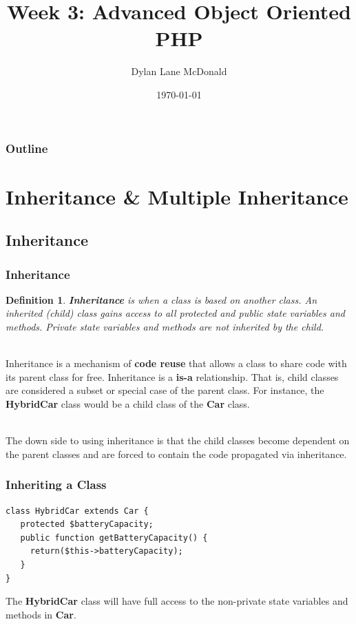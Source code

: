 \documentclass[aspectratio=169]{beamer}
\title{Week 3: Advanced Object Oriented PHP}
\author{Dylan Lane McDonald}
\institute{CNM STEMulus Center\\Web Development with PHP}
\date{\today}
\newtheorem{defn}{Definition}
\begin{document}
\lstset{language=Java}
\begin{frame}
\titlepage
\end{frame}

\begin{frame}
\frametitle{Outline}
\tableofcontents
\end{frame}

\section{Inheritance \& Multiple Inheritance}
\subsection{Inheritance}
\begin{frame}
\frametitle{Inheritance}
\begin{defn}
\textbf{Inheritance} is when a class is based on another class. An inherited (child) class gains access to all protected and public state variables and methods. Private state variables and methods are not inherited by the child.
\end{defn}

\pause
\mbox{}\\
Inheritance is a mechanism of \textbf{code reuse} that allows a class to share code with its parent class for free. Inheritance is a \textbf{is-a} relationship. That is, child classes are considered a subset or special case of the parent class. For instance, the \textbf{HybridCar} class would be a child class of the \textbf{Car} class.

\mbox{}\\
The down side to using inheritance is that the child classes become dependent on the parent classes and are forced to contain the code propagated via inheritance.
\end{frame}

\begin{frame}[fragile]
\frametitle{Inheriting a Class}
\begin{lstlisting}[caption=Creating a Hybrid from a Car]
class HybridCar extends Car {
   protected $batteryCapacity;
   public function getBatteryCapacity() {
     return($this->batteryCapacity);
   }
}
\end{lstlisting}

The \textbf{HybridCar} class will have full access to the non-private state variables and methods in \textbf{Car}.
\end{frame}
\end{document}
